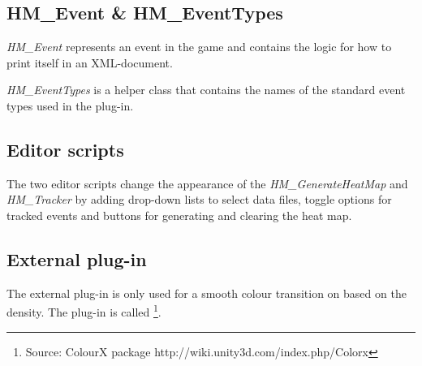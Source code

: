 \subsection{HM\_Event \& HM\_EventTypes}
\label{CO_Event}
\textit{HM\_Event} represents an event in the game and contains the logic for how to print itself in an XML-document.

\textit{HM\_EventTypes} is a helper class that contains the names of the standard event types used in the plug-in.

\subsection{Editor scripts}
\label{CO_Editor}
The two editor scripts change the appearance of the \textit{HM\_GenerateHeatMap} and \textit{HM\_Tracker} by adding drop-down lists to select data files, toggle options for tracked events and buttons for generating and clearing the heat map.
\subsection{External plug-in}
\label{CO_PlugIn}
The external plug-in is only used for a smooth colour transition on based on the density. The plug-in is called \footnote{Source: ColourX package http://wiki.unity3d.com/index.php/Colorx}.
